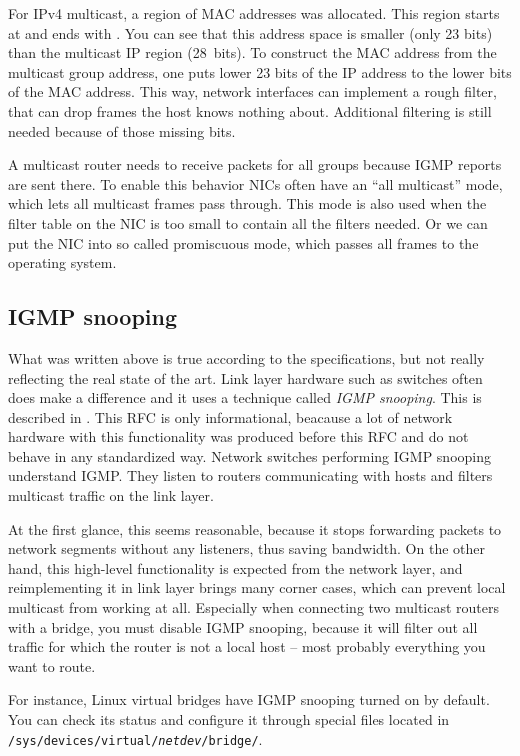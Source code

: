 For IPv4 multicast, a region of MAC addresses was allocated. This region starts
at  and ends with . You can see
that this address space is smaller (only 23 bits) than the multicast IP region
(28~bits). To construct the MAC address from the multicast group address, one
puts lower 23 bits of the IP address to the lower bits of the MAC address. This
way, network interfaces can implement a rough filter, that can drop frames the
host knows nothing about. Additional filtering is still needed because of those
missing bits.

A multicast router needs to receive packets for all groups because IGMP reports
are sent there. To enable this behavior NICs often have an ``all multicast''
mode, which lets all multicast frames pass through. This mode is also used when
the filter table on the NIC is too small to contain all the filters needed. Or
we can put the NIC into so called promiscuous mode, which passes all frames
to the operating system.

\subsection{IGMP snooping}

What was written above is true according to the specifications, but not really
reflecting the real state of the art. Link layer hardware such as switches often does
make a difference and it uses a technique called \emph{IGMP snooping}. This is described
in . This RFC is only informational, beacause a lot of network hardware with
this functionality was produced before this RFC and do not behave in any
standardized way. Network switches performing IGMP snooping understand IGMP. They
listen to routers communicating with hosts and filters multicast traffic on
the link layer.

At the first glance, this seems reasonable, because it stops forwarding packets
to network segments without any listeners, thus saving bandwidth. On the other
hand, this high-level functionality is expected from the network layer, and
reimplementing it in link layer brings many corner cases, which can prevent
local multicast from working at all. Especially when connecting two multicast
routers with a bridge, you must disable IGMP snooping, because it will filter
out all traffic for which the router is not a local host -- most probably
everything you want to route.

For instance, Linux virtual bridges have IGMP snooping turned on by default.
You can check its status and configure it through special files located in
\texttt{/sys/devices/virtual/{\it netdev\/}/bridge/}.

